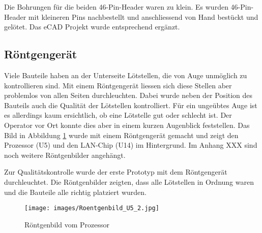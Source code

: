 Die Bohrungen für die beiden 46-Pin-Header waren zu klein. Es wurden 46-Pin-Header mit kleineren Pins nachbestellt und anschliessend von Hand bestückt und gelötet. Das eCAD Projekt wurde entsprechend ergänzt.


\subsection{Röntgengerät}
Viele Bauteile haben an der Unterseite Lötstellen, die von Auge unmöglich zu kontrollieren sind. Mit einem Röntgengerät liessen sich diese Stellen aber problemlos von allen Seiten durchleuchten. Dabei wurde neben der Position des Bauteils auch die Qualität der Lötstellen kontrolliert. Für ein ungeübtes Auge ist es allerdings kaum ersichtlich, ob eine Lötstelle gut oder schlecht ist. Der Operator vor Ort konnte dies aber in einem kurzen Augenblick feststellen. Das Bild in Abbildung \ref{fig:roentgenbildProzessor} wurde mit einem Röntgengerät gemacht und zeigt den Prozessor (U5) und den LAN-Chip (U14) im Hintergrund. Im Anhang XXX sind noch weitere Röntgenbilder angehängt.


Zur Qualitätskontrolle wurde der erste Prototyp mit dem Röntgengerät durchleuchtet. Die Röntgenbilder zeigten, dass alle Lötstellen in Ordnung waren und die Bauteile alle richtig platziert wurden.

\begin{figure}[!ht]
\centering
\texttt{[image: images/Roentgenbild\_U5\_2.jpg]}
\caption{Röntgenbild vom Prozessor}
\label{fig:roentgenbildProzessor}
\end{figure}


